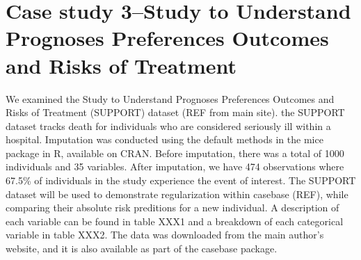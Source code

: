 \documentclass[
]{jss}
\begin{document}
\hypertarget{case-study-3study-to-understand-prognoses-preferences-outcomes-and-risks-of-treatment}{%
\section{Case study 3--Study to Understand Prognoses Preferences
Outcomes and Risks of
Treatment}\label{case-study-3study-to-understand-prognoses-preferences-outcomes-and-risks-of-treatment}}

We examined the Study to Understand Prognoses Preferences Outcomes and
Risks of Treatment (SUPPORT) dataset (REF from main site). the SUPPORT
dataset tracks death for individuals who are considered seriously ill
within a hospital. Imputation was conducted using the default methods in
the mice package in R, available on CRAN. Before imputation, there was a
total of 1000 individuals and 35 variables. After imputation, we have
474 observations where 67.5\% of individuals in the study experience the
event of interest. The SUPPORT dataset will be used to demonstrate
regularization within casebase (REF), while comparing their absolute
risk preditions for a new individual. A description of each variable can
be found in table XXX1 and a breakdown of each categorical variable in
table XXX2. The data was downloaded from the main author's website, and
it is also available as part of the casebase package.
\end{document}
